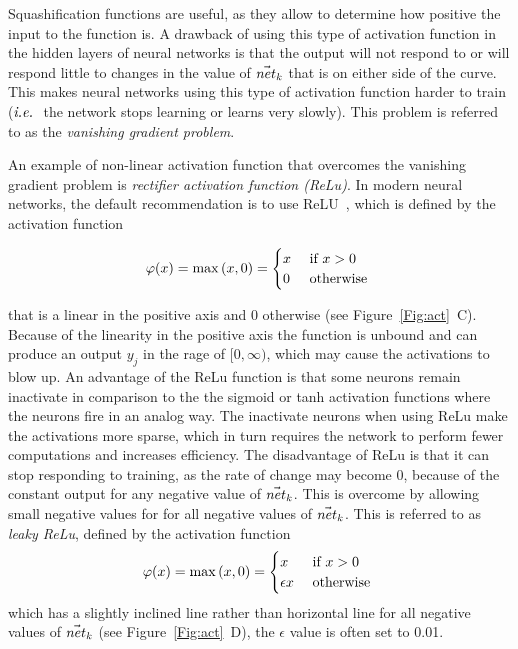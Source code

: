 Squashification functions are useful, as they allow to determine how positive the input to the function is. A drawback of using this type of activation function in the hidden layers of neural networks is that the output will not respond to or will respond little to changes in the value of $\vec{net}_{k}$ that is on either side of the curve. This makes neural networks using this type of activation function harder to train ($\textit{i.e.}\ $ the network stops learning or learns very slowly). This problem is referred to as the \textit{vanishing gradient problem}.

An example of non-linear activation function that overcomes the vanishing gradient problem is \textit{rectifier activation function (ReLu)}. In modern neural networks, the default recommendation is to use ReLU~\cite{JarrettKRL09, NairH10, Heaton18}, which is deﬁned by the activation function 

\begin{equation}
\varphi(x)=\max \left(x, 0\right)= \begin{cases}x &  \text { if } x>0 \\ 0 & \text { otherwise }\end{cases}
\label{eq:relu}
\end{equation}

that is a linear in the positive axis and $0$ otherwise (see Figure~\ref{Fig:act}~C). Because of the linearity in the positive axis the function is unbound and can produce an output $y_j$ in the rage of $[0,\infty)$, which may cause the activations to blow up. An advantage of the ReLu function is that some neurons remain inactivate in comparison to the the sigmoid or tanh activation functions where the neurons fire in an analog way. The inactivate neurons when using ReLu make the activations more sparse, which in turn requires the network to perform fewer computations and increases efficiency. The disadvantage of ReLu is that it can stop responding to training, as the rate of change may become $0$, because of the constant output for any negative value of $\vec{net}_{k}$. This is overcome by allowing small negative values for for all negative values of $\vec{net}_{k}$. This is referred to as \textit{leaky ReLu}, defined by the activation function 
\begin{equation*}
\varphi(x) =\max \left(x, 0\right)= \begin{cases} x & \text { if } x>0 \\ \epsilon x & \text { otherwise }\end{cases}
\end{equation*}
which has a slightly inclined line rather than horizontal line for all negative values of $\vec{net}_{k}$ (see Figure~\ref{Fig:act}~D), the $\epsilon$ value is often set to 0.01.


